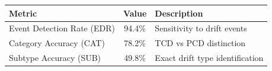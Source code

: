 \begin{tabular}{|l|c|l|}
\hline
\textbf{Metric} & \textbf{Value} & \textbf{Description} \\
\hline
Event Detection Rate (EDR) & 94.4\% & Sensitivity to drift events \\
Category Accuracy (CAT) & 78.2\% & TCD vs PCD distinction \\
Subtype Accuracy (SUB) & 49.8\% & Exact drift type identification \\
\hline
\end{tabular}